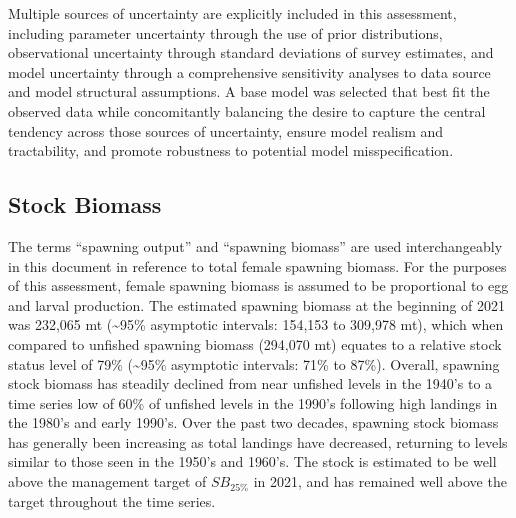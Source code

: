 \documentclass[11pt,
  english,
  a4paper,
]{article}
\begin{document}
\leavevmode\tagmcend\tagstructend\par


Multiple sources of uncertainty are explicitly included in this assessment, including parameter uncertainty through the use of prior distributions, observational uncertainty through standard deviations of survey estimates, and model uncertainty through a comprehensive sensitivity analyses to data source and model structural assumptions. A base model was selected that best fit the observed data while concomitantly balancing the desire to capture the central tendency across those sources of uncertainty, ensure model realism and tractability, and promote robustness to potential model misspecification.

\leavevmode\tagmcend\tagstructend\par


\hypertarget{stock-biomass}{%
\subsection*{Stock Biomass}\label{stock-biomass}}

\leavevmode\tagmcend\tagstructend


The terms ``spawning output'' and ``spawning biomass'' are used interchangeably in this document in reference to total female spawning biomass. For the purposes of this assessment, female spawning biomass is assumed to be proportional to egg and larval production. The estimated spawning biomass at the beginning of 2021 was 232,065 mt (\textasciitilde95\% asymptotic intervals: 154,153 to 309,978 mt), which when compared to unfished spawning biomass (294,070 mt) equates to a relative stock status level of 79\% (\textasciitilde95\% asymptotic intervals: 71\% to 87\%). Overall, spawning stock biomass has steadily declined from near unfished levels in the 1940's to a time series low of 60\% of unfished levels in the 1990's following high landings in the 1980's and early 1990's. Over the past two decades, spawning stock biomass has generally been increasing as total landings have decreased, returning to levels similar to those seen in the 1950's and 1960's. The stock is estimated to be well above the management target of {\(SB_{25\%}\)\leavevmode\tagmcend\tagstructend} in 2021, and has remained well above the target throughout the time series.
\end{document}
